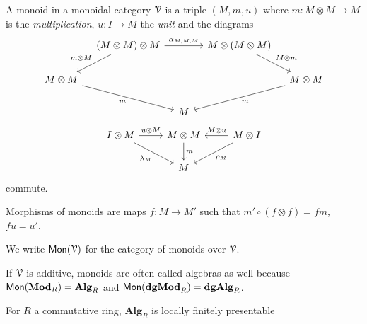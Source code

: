 \documentclass[a4paper,11pt,oneside,openany]{scrbook}
\begin{document}
\begin{defn}
    A monoid in a monoidal category $\operatorname{\mathcal{V}}$ is a triple $(M,m,u)$ where $m\colon M\otimes M\rightarrow M$ is the \emph{multiplication}, $u\colon I\rightarrow M$ the \emph{unit} and the diagrams
    \[
    \begin{tikzcd}[column sep=1.0em]
        & (M\otimes M)\otimes M\ar[rr, "\alpha_{M,M,M}"]\ar[dl, "m\otimes M", swap]
        && M\otimes (M\otimes M)\ar[dr, "M\otimes m"] \\
        M\otimes M\ar[drr, "m", swap]
        &&&& M\otimes M\ar[dll, "m"] \\
        && M
    \end{tikzcd}
    \]
    \[
    \begin{tikzcd}
        I\otimes M\ar[r, "u\otimes M"]\ar[dr, "\lambda_M", swap]
        & M\otimes M\ar[d, "m"]
        & M\otimes I\ar[l, "M\otimes u", swap]\ar[dl, "\rho_M"] \\
        & M
    \end{tikzcd}
    \]
    commute.

    Morphisms of monoids are maps $f\colon M\rightarrow M'$ such that $m'\circ (f\otimes f)=fm$, $fu=u'$.

    We write $\operatorname{\mathsf{Mon}}(\operatorname{\mathcal{V}})$ for the category of monoids over $\operatorname{\mathcal{V}}$.
\end{defn}

\begin{rmk}
    If $\operatorname{\mathcal{V}}$ is additive, monoids are often called algebras as well because     $\operatorname{\mathsf{Mon}}({\normalfont\textbf{Mod}}_R)=\mathbf{Alg}_R$ and $\operatorname{\mathsf{Mon}}({\normalfont\textbf{dgMod}}_R)=\mathbf{dgAlg}_R$.
\end{rmk}


\begin{exmp}
    For $ R $ a commutative ring, $ \mathbf{Alg}_R $ is locally finitely presentable
\end{exmp}
\end{document}
